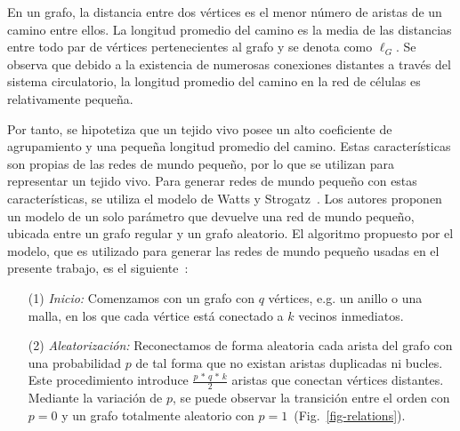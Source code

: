 En un grafo, la distancia entre dos v\'ertices es el menor n\'umero de aristas de un camino entre ellos. La longitud promedio del camino es la media de las distancias entre todo par de v\'ertices pertenecientes al grafo y se denota como $\ell_G$. Se observa que debido a la existencia de numerosas conexiones distantes a través del sistema circulatorio, la longitud promedio del camino en la red de células es relativamente pequeña.

Por tanto, se hipotetiza que un tejido vivo posee un alto coeficiente de agrupamiento y una pequeña longitud promedio del camino. Estas características son propias de las redes de mundo pequeño, por lo que se utilizan para representar un tejido vivo. Para generar redes de mundo pequeño con estas características, se utiliza el modelo de Watts y Strogatz~\cite{watts}. Los autores proponen un modelo de un solo par\'ametro que devuelve una red de mundo peque\~no, ubicada entre un grafo regular y un grafo aleatorio. El algoritmo propuesto por el modelo, que es utilizado para generar las redes de mundo peque\~no usadas en el presente trabajo, es el siguiente~\cite{complexnetworks}:

\begin{enumerate}
\item [(1)] \emph{Inicio:} Comenzamos con un grafo con $q$ v\'ertices, e.g. un anillo o una malla, en los que cada v\'ertice est\'a conectado a $k$ vecinos inmediatos. 

\item [(2)] \emph{Aleatorizaci\'on:} Reconectamos de forma aleatoria cada arista del grafo con una probabilidad $p$ de tal forma que no existan aristas duplicadas ni bucles. Este procedimiento introduce $\frac{p\,*\,q\,*\,k}{2} $ aristas que conectan v\'ertices distantes. Mediante la variaci\'on de $p$, se puede observar la transici\'on entre el orden con $p = 0$ y un grafo totalmente aleatorio con $p = 1$~(Fig.~\ref{fig-relations}).
\end{enumerate}

